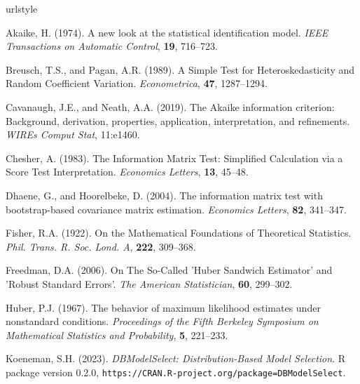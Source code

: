 \documentclass[submit]{smj}
\begin{document}
\begin{thebibliography}{99}
\providecommand{\natexlab}[1]{#1}
\providecommand{\url}[1]{\texttt{#1}}
\expandafter\ifx\csname urlstyle\endcsname\relax
  \providecommand{\doi}[1]{doi: #1}\else
  \providecommand{\doi}{doi: \begingroup \urlstyle{rm}\Url}\fi

{\rm Akaike, H.} (1974).
\newblock A new look at the statistical identification model.
\newblock \emph{IEEE Transactions on Automatic Control}, {\bf 19},  716--723.

{\rm Breusch, T.S., and Pagan, A.R.} (1989).
\newblock A Simple Test for Heteroskedasticity and Random Coefficient Variation.
\newblock \emph{Econometrica}, {\bf 47},  1287--1294.

{\rm Cavanaugh, J.E., and Neath, A.A.} (2019).
\newblock The Akaike information criterion: Background, derivation, properties, application, interpretation, and refinements.
\newblock \emph{WIREs Comput Stat}, 11:e1460.

{\rm Chesher, A.} (1983).
\newblock The Information Matrix Test: Simplified Calculation via a Score Test Interpretation.
\newblock \emph{Economics Letters}, {\bf 13},  45--48.

{\rm Dhaene, G., and Hoorelbeke, D.} (2004).
\newblock The information matrix test with bootstrap-based covariance matrix estimation.
\newblock \emph{Economics Letters}, {\bf 82},  341--347.

{\rm Fisher, R.A.} (1922).
\newblock On the Mathematical Foundations of Theoretical Statistics.
\newblock \emph{Phil. Trans. R. Soc. Lond. A}, {\bf 222},  309--368.

{\rm Freedman, D.A.} (2006).
\newblock On The So-Called 'Huber Sandwich Estimator' and 'Robust Standard Errors'.
\newblock \emph{The American Statistician}, {\bf 60},  299--302.

{\rm Huber, P.J.} (1967).
\newblock The behavior of maximum likelihood estimates under nonstandard conditions.
\newblock \emph{Proceedings of the Fifth Berkeley Symposium on Mathematical Statistics and Probability}, {\bf 5},  221--233.

{\rm Koeneman, S.H.} (2023).
\newblock \emph{DBModelSelect: Distribution-Based Model Selection}.
\newblock R package version 0.2.0, \url{https://CRAN.R-project.org/package=DBModelSelect}.


\end{thebibliography}
\end{document}

